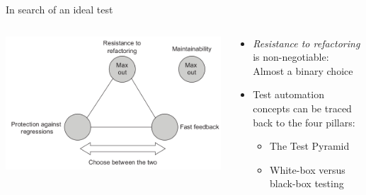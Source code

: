 \documentclass[english,handout,10pt,aspectratio=169,t]{beamer}
\begin{document}
\begin{frame}{In search of an ideal test}
  \begin{columns}[T]
    \begin{column}[]{0.55\textwidth}
      \includegraphics[width=\textwidth]{images/ideal_strategy.png}
    \end{column}
    \begin{column}[]{0.45\textwidth}
      \begin{itemize}
        \item \textit{Resistance to refactoring} is non-negotiable: Almost a binary choice
        \item Test automation concepts can be traced back to the four pillars:
        \begin{itemize}
          \item The Test Pyramid
          \item White-box versus black-box testing
        \end{itemize}
      \end{itemize}
    \end{column}
  \end{columns}
\end{frame}
\end{document}
